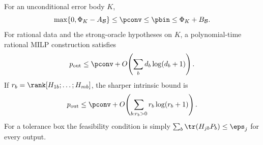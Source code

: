 \begin{theorem}\label{thm:block-psd}
For an unconditional error body $K$,
\begin{equation}\label{eq:block-psd-law}
 \max\{0,\Phi_K-A_{\mathcal B}\}\le\pconv\le\pbin
                                       \le\Phi_K+B_{\mathcal B}.
\end{equation}
For rational data and the strong-oracle hypotheses on $K$, a
polynomial-time rational MILP construction satisfies
\[
 p_{\rm out}\le\pconv+O\!\left(\sum_bd_b\log(d_b+1)\right).
\]
If $r_b=\rank[H_{1b};\ldots;H_{mb}]$, the sharper intrinsic bound is
\begin{equation}\label{eq:block-rank-count}
 p_{\rm out}\le\pconv+
       O\!\left(\sum_{b:r_b>0}r_b\log(r_b+1)\right).
\end{equation}
For a tolerance box the feasibility condition is simply
$\sum_b\tr(H_{jb}P_b)\le\eps_j$ for every output.
\end{theorem}
